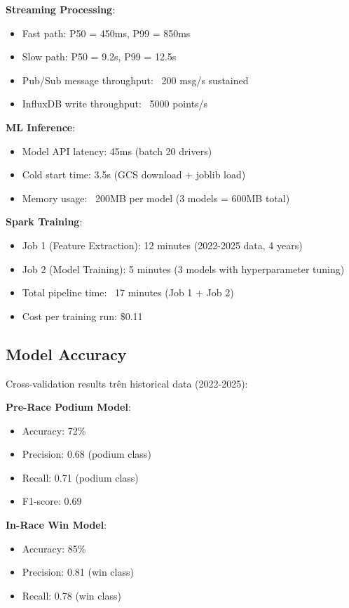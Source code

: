 \documentclass[conference,10pt]{IEEEtran}
\begin{document}
\textbf{Streaming Processing}:
\begin{itemize}
    \item Fast path: P50 = 450ms, P99 = 850ms
    \item Slow path: P50 = 9.2s, P99 = 12.5s
    \item Pub/Sub message throughput: ~200 msg/s sustained
    \item InfluxDB write throughput: ~5000 points/s
\end{itemize}

\textbf{ML Inference}:
\begin{itemize}
    \item Model API latency: 45ms (batch 20 drivers)
    \item Cold start time: 3.5s (GCS download + joblib load)
    \item Memory usage: ~200MB per model (3 models = 600MB total)
\end{itemize}

\textbf{Spark Training}:
\begin{itemize}
    \item Job 1 (Feature Extraction): 12 minutes (2022-2025 data, 4 years)
    \item Job 2 (Model Training): 5 minutes (3 models with hyperparameter tuning)
    \item Total pipeline time: ~17 minutes (Job 1 + Job 2)
    \item Cost per training run: \$0.11
\end{itemize}

\subsection{Model Accuracy}

Cross-validation results trên historical data (2022-2025):

\textbf{Pre-Race Podium Model}:
\begin{itemize}
    \item Accuracy: 72\%
    \item Precision: 0.68 (podium class)
    \item Recall: 0.71 (podium class)
    \item F1-score: 0.69
\end{itemize}

\textbf{In-Race Win Model}:
\begin{itemize}
    \item Accuracy: 85\%
    \item Precision: 0.81 (win class)
    \item Recall: 0.78 (win class)
\end{itemize}
\end{document}
